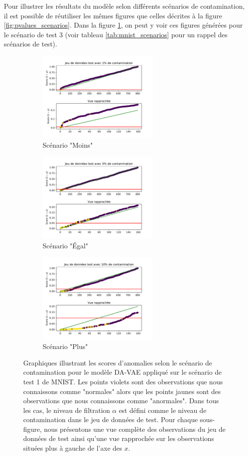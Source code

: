 Pour illustrer les résultats du modèle selon différents scénarios de contamination, il est possible de réutiliser les mêmes figures que celles décrites à la figure \ref{fig:pvalues_scenarios}. Dans la figure \ref{fig:pvalues_scenarios_mnist}, on peut y voir ces figures générées pour le scénario de test 3 (voir tableau \ref{tab:mnist_scenarios} pour un rappel des scénarios de test).

\begin{figure}[H]
	\centering
	\begin{subfigure}{6cm}
		\centering\includegraphics[width=6cm]{images/images_davae/pvalues_scenario3_moins}
		\caption{Scénario "Moins"}
	\end{subfigure}
	\begin{subfigure}{6cm}
		\centering\includegraphics[width=6cm]{images/images_davae/pvalues_scenario3_egal}
		\caption{Scénario "Égal"}
	\end{subfigure}
	\begin{subfigure}{6cm}
		\centering\includegraphics[width=6cm]{images/images_davae/pvalues_scenario3_plus}
		\caption{Scénario "Plus"}
	\end{subfigure}
	\caption{Graphiques illustrant les scores d'anomalies selon le scénario de contamination pour le modèle DA-VAE appliqué sur le scénario de test 1 de MNIST. Les points violets sont des observations que nous connaissons comme "normales" alors que les points jaunes sont des observations que nous connaissons comme "anormales". Dans tous les cas, le niveau de filtration $\alpha$ est défini comme le niveau de contamination dans le jeu de données de test. Pour chaque sous-figure, nous présentons une vue complète des observations du jeu de données de test ainsi qu'une vue rapprochée sur les observations situées plus à gauche de l'axe des $x$.}
	\label{fig:pvalues_scenarios_mnist}
\end{figure}

